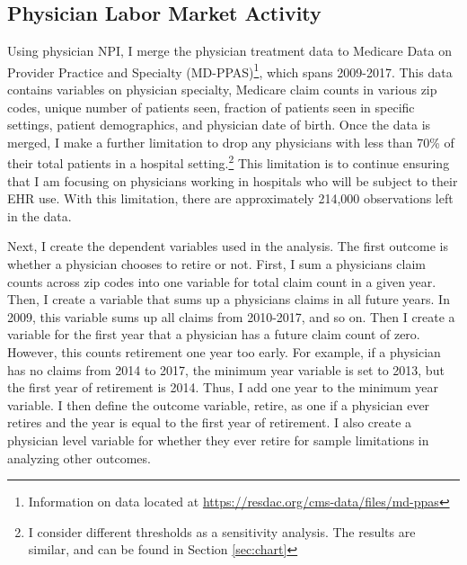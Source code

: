 \documentclass[12pt]{article}
\begin{document}
\subsection{Physician Labor Market Activity}\label{sec:appmdppas}

Using physician NPI, I merge the physician treatment data to Medicare Data on Provider Practice and Specialty (MD-PPAS)\footnote{Information on data located at \hyperlink{https://resdac.org/cms-data/files/md-ppas}{https://resdac.org/cms-data/files/md-ppas}}, which spans 2009-2017. This data contains variables on physician specialty, Medicare claim counts in various zip codes, unique number of patients seen, fraction of patients seen in specific settings, patient demographics, and physician date of birth. Once the data is merged, I make a further limitation to drop any physicians with less than 70\% of their total patients in a hospital setting.\footnote{I consider different thresholds as a sensitivity analysis. The results are similar, and can be found in Section \ref{sec:chart}} This limitation is to continue ensuring that I am focusing on physicians working in hospitals who will be subject to their EHR use. With this limitation, there are approximately 214,000 observations left in the data. 

Next, I create the dependent variables used in the analysis. The first outcome is whether a physician chooses to retire or not. First, I sum a physicians claim counts across zip codes into one variable for total claim count in a given year. Then, I create a variable that sums up a physicians claims in all future years. In 2009, this variable sums up all claims from 2010-2017, and so on. Then I create a variable for the first year that a physician has a future claim count of zero. However, this counts retirement one year too early. For example, if a physician has no claims from 2014 to 2017, the minimum year variable is set to 2013, but the first year of retirement is 2014. Thus, I add one year to the minimum year variable. I then define the outcome variable, retire, as one if a physician ever retires and the year is equal to the first year of retirement. I also create a physician level variable for whether they ever retire for sample limitations in analyzing other outcomes. 
\end{document}
